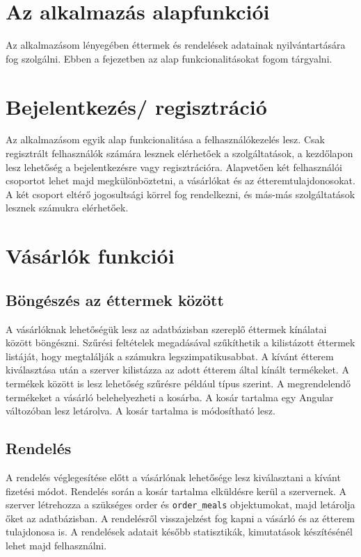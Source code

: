 \section{Az alkalmazás alapfunkciói}

Az alkalmazásom lényegében éttermek és rendelések adatainak nyilvántartására fog szolgálni. Ebben a fejezetben az alap funkcionalitásokat fogom tárgyalni.

\section{Bejelentkezés/ regisztráció}

Az alkalmazásom egyik alap funkcionalitása a felhasználókezelés lesz. Csak regisztrált felhasználók számára lesznek elérhetőek a szolgáltatások, a kezdőlapon lesz lehetőség a bejelentkezésre vagy regisztrációra. Alapvetően két felhasználói csoportot lehet majd megkülönböztetni, a vásárlókat és az étteremtulajdonosokat. A két csoport eltérő jogosultsági körrel fog rendelkezni, és más-más szolgáltatások lesznek számukra elérhetőek.

\section{Vásárlók funkciói}

\subsection{Böngészés az éttermek között}

A vásárlóknak lehetőségük lesz az adatbázisban szereplő éttermek kínálatai között böngészni. Szűrési feltételek megadásával szűkíthetik a kilistázott éttermek listáját, hogy megtalálják a számukra legszimpatikusabbat.
A kívánt étterem kiválasztása után a szerver kilistázza az adott étterem által kínált termékeket. A termékek között is lesz lehetőség szűrésre például típus szerint. A megrendelendő termékeket a vásárló belehelyezheti a kosárba. A kosár tartalma egy Angular változóban lesz letárolva. A kosár tartalma is módosítható lesz.

\subsection{Rendelés}

A rendelés véglegesítése előtt a vásárlónak lehetősége lesz kiválasztani a kívánt fizetési módot. Rendelés során a kosár tartalma elküldésre kerül a szervernek. A szerver létrehozza a szükséges order és \texttt{order\_meals} objektumokat, majd letárolja őket az adatbázisban. A rendelésről visszajelzést fog kapni a vásárló és az étterem tulajdonosa is. A rendelések adatait később statisztikák, kimutatások készítésénél lehet majd felhasználni.

